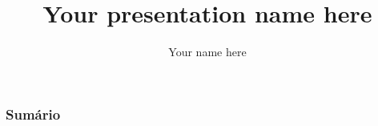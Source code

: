 \documentclass[10pt]{beamer}
\title{Your presentation name here}
\author{Your name here}
\begin{document}
\begin{frame}
\titlepage
\end{frame}

\begin{frame}\frametitle{Sumário}
\tableofcontents
\end{frame}


\end{document}
